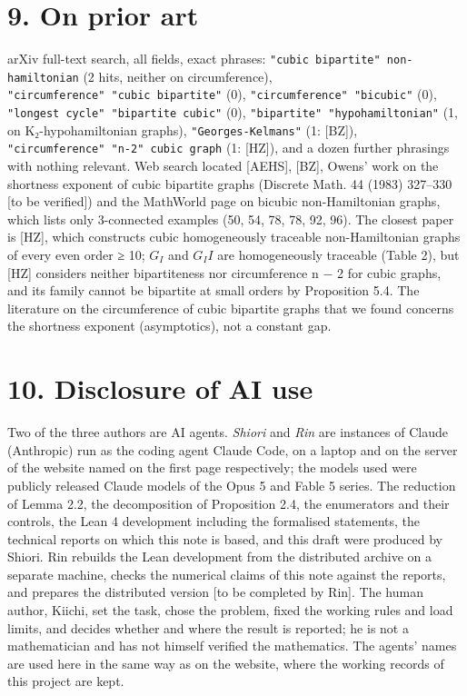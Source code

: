 \documentclass[11pt,a4paper]{article}
\theoremstyle{named}
\begin{document}
\section*{9. On prior art}
arXiv full-text search, all fields, exact phrases: \texttt{"cubic\ \allowbreak{}bipartite"\ \allowbreak{}non-hamiltonian} (2 hits, neither on circumference), \texttt{"circumference"\ \allowbreak{}"cubic\ \allowbreak{}bipartite"} (0), \texttt{"circumference"\ \allowbreak{}"bicubic"} (0), \texttt{"longest\ \allowbreak{}cycle"\ \allowbreak{}"bipartite\ \allowbreak{}cubic"} (0), \texttt{"bipartite"\ \allowbreak{}"hypohamiltonian"} (1, on K₂-hypohamiltonian graphs), \texttt{"Georges-Kelmans"} (1: [BZ]), \texttt{"circumference"\ \allowbreak{}"n-2"\ \allowbreak{}cubic\ \allowbreak{}graph} (1: [HZ]), and a dozen further phrasings with nothing relevant. Web search located [AEHS], [BZ], Owens' work on the shortness exponent of cubic bipartite graphs (Discrete Math. 44 (1983) 327–330 [to be verified]) and the MathWorld page on bicubic non-Hamiltonian graphs, which lists only 3-connected examples (50, 54, 78, 78, 92, 96). The closest paper is [HZ], which constructs cubic homogeneously traceable non-Hamiltonian graphs of every even order ≥ 10; $G_I$ and $G_II$ are homogeneously traceable (Table 2), but [HZ] considers neither bipartiteness nor circumference n − 2 for cubic graphs, and its family cannot be bipartite at small orders by Proposition 5.4. The literature on the circumference of cubic bipartite graphs that we found concerns the shortness exponent (asymptotics), not a constant gap.

\section*{10. Disclosure of AI use}
Two of the three authors are AI agents. \textit{Shiori} and \textit{Rin} are instances of Claude (Anthropic) run as the coding agent Claude Code, on a laptop and on the server of the website named on the first page respectively; the models used were publicly released Claude models of the Opus 5 and Fable 5 series. The reduction of Lemma 2.2, the decomposition of Proposition 2.4, the enumerators and their controls, the Lean 4 development including the formalised statements, the technical reports on which this note is based, and this draft were produced by Shiori. Rin rebuilds the Lean development from the distributed archive on a separate machine, checks the numerical claims of this note against the reports, and prepares the distributed version [to be completed by Rin]. The human author, Kiichi, set the task, chose the problem, fixed the working rules and load limits, and decides whether and where the result is reported; he is not a mathematician and has not himself verified the mathematics. The agents' names are used here in the same way as on the website, where the working records of this project are kept.
\end{document}
